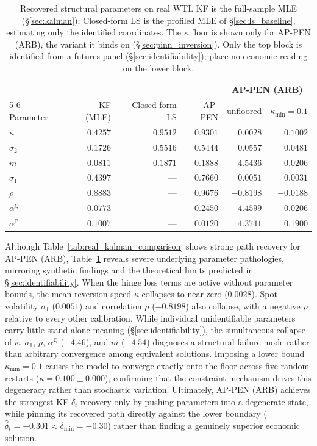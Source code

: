 \documentclass[11pt, a4paper]{article}
\begin{document}
\begin{table}[h!]
\centering
\footnotesize
\caption{Recovered structural parameters on real WTI. KF is the
full-sample MLE (\S\ref{sec:kalman}); Closed-form LS is the profiled MLE of
\S\ref{sec:ls_baseline}, estimating only the identified coordinates. The
$\kappa$ floor is shown only for AP-PEN (ARB), the variant it binds on
(\S\ref{sec:pinn_inversion}). Only the top block is identified from a futures
panel (\S\ref{sec:identifiability}); place no economic reading on the lower
block.}
\label{tab:real_psi_pathology}
\begin{tabular}{lrrrrr}
\toprule
& & & & \multicolumn{2}{c}{AP-PEN (ARB)} \\
\cmidrule(lr){5-6}
Parameter & KF (MLE) & Closed-form LS & AP-PEN & unfloored & $\kappa_{\min}=0.1$ \\
\midrule
$\kappa$      & $0.4257$ & $0.9512$ & $0.9301$ & $0.0028$ & $0.1002$ \\
$\sigma_2$    & $0.1726$ & $0.5516$ & $0.5444$ & $0.0557$ & $0.0481$ \\
$m$           & $0.0811$ & $0.1871$ & $0.1888$ & $-4.5436$ & $-0.0206$ \\
\midrule
$\sigma_1$    & $0.4397$ & --- & $0.7660$ & $0.0051$ & $0.0031$ \\
$\rho$        & $0.8883$ & --- & $0.9676$ & $-0.8198$ & $-0.0188$ \\
$\alpha^{\mathbb{Q}}$ & $-0.0773$ & --- & $-0.2450$ & $-4.4599$ & $-0.0206$ \\
$\alpha^{\mathbb{P}}$ & $0.1007$ & --- & $0.0120$ & $4.3741$ & $0.1900$ \\
\bottomrule
\end{tabular}
\end{table}

Although Table~\ref{tab:real_kalman_comparison} shows strong path recovery for AP-PEN (ARB), Table~\ref{tab:real_psi_pathology} reveals severe underlying parameter pathologies, mirroring synthetic findings and the theoretical limits predicted in \S\ref{sec:identifiability}. When the hinge loss terms are active without parameter bounds, the mean-reversion speed $\kappa$ collapses to near zero ($0.0028$). Spot volatility $\sigma_1$ ($0.0051$) and correlation $\rho$ ($-0.8198$) also collapse, with a negative $\rho$ relative to every other calibration. While individual unidentifiable parameters carry little stand-alone meaning (\S\ref{sec:identifiability}), the simultaneous collapse of $\kappa$, $\sigma_1$, $\rho$, $\alpha^{\mathbb{Q}}$ ($-4.46$), and $m$ ($-4.54$) diagnoses a structural failure mode rather than arbitrary convergence among equivalent solutions. Imposing a lower bound $\kappa_{\min}=0.1$ causes the model to converge exactly onto the floor across five random restarts ($\kappa = 0.100 \pm 0.000$), confirming that the constraint mechanism drives this degeneracy rather than stochastic variation. Ultimately, AP-PEN (ARB) achieves the strongest KF $\delta_t$ recovery only by pushing parameters into a degenerate state, while pinning its recovered path directly against the lower boundary ($\hat{\delta}_t = -0.301 \approx \delta_{\min} = -0.30$) rather than finding a genuinely superior economic solution.
\end{document}
